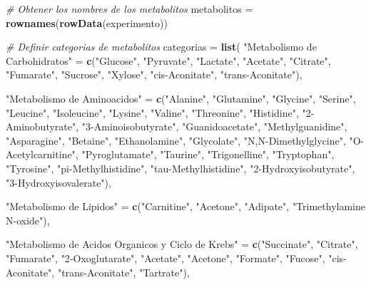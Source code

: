 \documentclass[
]{article}
\newenvironment{Shaded}{\begin{snugshade}}{\end{snugshade}}
\newcommand{\CommentTok}[1]{\textcolor[rgb]{0.56,0.35,0.01}{\textit{#1}}}
\newcommand{\FunctionTok}[1]{\textcolor[rgb]{0.13,0.29,0.53}{\textbf{#1}}}
\newcommand{\NormalTok}[1]{#1}
\newcommand{\OtherTok}[1]{\textcolor[rgb]{0.56,0.35,0.01}{#1}}
\newcommand{\StringTok}[1]{\textcolor[rgb]{0.31,0.60,0.02}{#1}}
\begin{document}
\begin{Shaded}
\begin{Highlighting}[]
\CommentTok{\# Obtener los nombres de los metabolitos}
\NormalTok{metabolitos }\OtherTok{=} \FunctionTok{rownames}\NormalTok{(}\FunctionTok{rowData}\NormalTok{(experimento))}

\CommentTok{\# Definir categorias de metabolitos}
\NormalTok{categorias }\OtherTok{=} \FunctionTok{list}\NormalTok{(}
  \StringTok{"Metabolismo de Carbohidratos"} \OtherTok{=} \FunctionTok{c}\NormalTok{(}\StringTok{"Glucose"}\NormalTok{, }\StringTok{"Pyruvate"}\NormalTok{, }\StringTok{"Lactate"}\NormalTok{, }\StringTok{"Acetate"}\NormalTok{, }\StringTok{"Citrate"}\NormalTok{, }\StringTok{"Fumarate"}\NormalTok{, }\StringTok{"Sucrose"}\NormalTok{, }\StringTok{"Xylose"}\NormalTok{, }\StringTok{"cis{-}Aconitate"}\NormalTok{, }\StringTok{"trans{-}Aconitate"}\NormalTok{),}
  
  \StringTok{"Metabolismo de Aminoacidos"} \OtherTok{=} \FunctionTok{c}\NormalTok{(}\StringTok{"Alanine"}\NormalTok{, }\StringTok{"Glutamine"}\NormalTok{, }\StringTok{"Glycine"}\NormalTok{, }\StringTok{"Serine"}\NormalTok{, }\StringTok{"Leucine"}\NormalTok{, }\StringTok{"Isoleucine"}\NormalTok{, }\StringTok{"Lysine"}\NormalTok{, }\StringTok{"Valine"}\NormalTok{, }\StringTok{"Threonine"}\NormalTok{, }\StringTok{"Histidine"}\NormalTok{, }\StringTok{"2{-}Aminobutyrate"}\NormalTok{, }\StringTok{"3{-}Aminoisobutyrate"}\NormalTok{, }\StringTok{"Guanidoacetate"}\NormalTok{, }\StringTok{"Methylguanidine"}\NormalTok{, }\StringTok{"Asparagine"}\NormalTok{, }\StringTok{"Betaine"}\NormalTok{, }\StringTok{"Ethanolamine"}\NormalTok{, }\StringTok{"Glycolate"}\NormalTok{, }\StringTok{"N,N{-}Dimethylglycine"}\NormalTok{, }\StringTok{"O{-}Acetylcarnitine"}\NormalTok{, }\StringTok{"Pyroglutamate"}\NormalTok{, }\StringTok{"Taurine"}\NormalTok{, }\StringTok{"Trigonelline"}\NormalTok{, }\StringTok{"Tryptophan"}\NormalTok{, }\StringTok{"Tyrosine"}\NormalTok{, }\StringTok{"pi{-}Methylhistidine"}\NormalTok{, }\StringTok{"tau{-}Methylhistidine"}\NormalTok{, }\StringTok{"2{-}Hydroxyisobutyrate"}\NormalTok{, }\StringTok{"3{-}Hydroxyisovalerate"}\NormalTok{),}
  
  \StringTok{"Metabolismo de Lipidos"} \OtherTok{=} \FunctionTok{c}\NormalTok{(}\StringTok{"Carnitine"}\NormalTok{, }\StringTok{"Acetone"}\NormalTok{, }\StringTok{"Adipate"}\NormalTok{, }\StringTok{"Trimethylamine N{-}oxide"}\NormalTok{),}
  
  \StringTok{"Metabolismo de Acidos Organicos y Ciclo de Krebs"} \OtherTok{=} \FunctionTok{c}\NormalTok{(}\StringTok{"Succinate"}\NormalTok{, }\StringTok{"Citrate"}\NormalTok{, }\StringTok{"Fumarate"}\NormalTok{, }\StringTok{"2{-}Oxoglutarate"}\NormalTok{, }\StringTok{"Acetate"}\NormalTok{, }\StringTok{"Acetone"}\NormalTok{, }\StringTok{"Formate"}\NormalTok{, }\StringTok{"Fucose"}\NormalTok{, }\StringTok{"cis{-}Aconitate"}\NormalTok{, }\StringTok{"trans{-}Aconitate"}\NormalTok{, }\StringTok{"Tartrate"}\NormalTok{),}
  

\end{Highlighting}
\end{Shaded}
\end{document}
